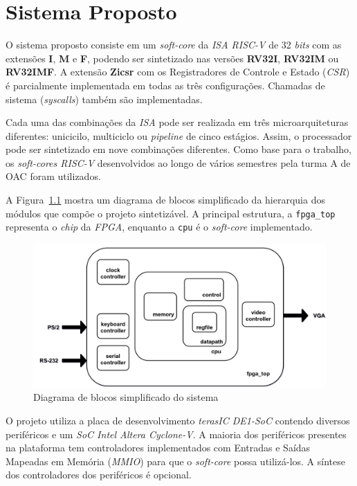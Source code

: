 \chapter{Sistema Proposto}\label{cap3_proposta}

{ O sistema proposto consiste em um \textit{soft-core} da \textit{ISA RISC-V}
    de 32 \textit{bits} com as extensões \textbf{I}, \textbf{M} e \textbf{F},
    podendo ser sintetizado nas versões \textbf{RV32I}, \textbf{RV32IM} ou
    \textbf{RV32IMF}. A extensão \textbf{Zicsr} com os Registradores de Controle
    e Estado (\textit{CSR}) é parcialmente implementada em todas as três
    configurações. Chamadas de sistema (\textit{syscalls}) também são implementadas.
}

{ Cada uma das combinações da \textit{ISA} pode ser realizada em três
    microarquiteturas diferentes: unicicilo, multiciclo ou \textit{pipeline} de
    cinco estágios. Assim, o processador pode ser sintetizado em nove
    combinações diferentes. Como base para o trabalho, os \textit{soft-cores RISC-V}
    desenvolvidos ao longo de vários semestres pela turma A de OAC foram utilizados.
}

{ A Figura~\ref{fig:diagram_fpga_blocks} mostra um diagrama de blocos simplificado
    da hierarquia dos módulos que compõe o projeto sintetizável. A principal
    estrutura, a \texttt{fpga\_top} representa o \textit{chip} da \textit{FPGA},
    enquanto a \texttt{cpu} é o \textit{soft-core} implementado.
}

\begin{figure}[H]
\centering
    \includegraphics[width=0.9\linewidth]{../images/fpga/fpga_simplified_block_diagram.png}
    \caption{Diagrama de blocos simplificado do sistema}\label{fig:diagram_fpga_blocks}
\end{figure}

{ O projeto utiliza a placa de desenvolvimento \textit{terasIC DE1-SoC} contendo
    diversos periféricos e um \textit{SoC Intel Altera Cyclone-V}. A maioria dos
    periféricos presentes na plataforma tem controladores implementados com
    Entradas e Saídas Mapeadas em Memória (\textit{MMIO}) para que o
    \textit{soft-core} possa utilizá-los. A síntese dos controladores dos
    periféricos é opcional.
}

